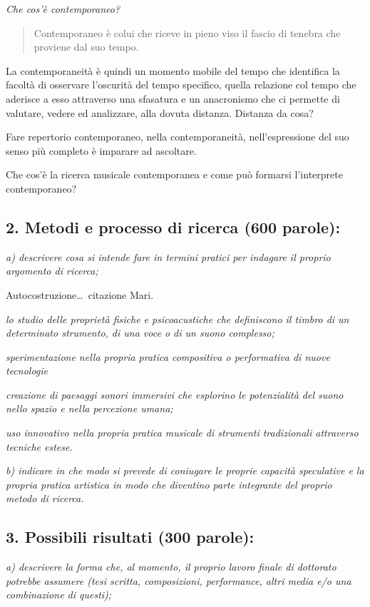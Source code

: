 \documentclass{gs-adonis}
\begin{document}
\emph{Che cos'è contemporaneo?}

\begin{quote}
  Contemporaneo è colui che riceve in pieno viso il fascio di tenebra che proviene dal suo tempo. \cite{agamben2008che}
\end{quote}

La contemporaneità è quindi un momento mobile del tempo che identifica la
facoltà di osservare l’oscurità del tempo specifico, quella relazione col
tempo che aderisce a esso attraverso una sfasatura e un anacronismo che ci
permette di valutare, vedere ed analizzare, alla dovuta distanza. Distanza da
cosa?

Fare repertorio contemporaneo, nella contemporaneità, nell’espressione del suo
senso più completo è imparare ad ascoltare.

Che cos'è la ricerca musicale contemporanea e come può formarsi l'interprete
contemporaneo?

\subsection{2. Metodi e processo di ricerca (600 parole):}

\emph{a) descrivere cosa si intende fare in termini pratici per indagare il proprio argomento di ricerca;}

Autocostruzione… citazione Mari.

\emph{lo studio delle proprietà fisiche e psicoacustiche che definiscono il timbro di un determinato strumento, di una voce o di un suono complesso;}

\emph{sperimentazione nella propria pratica compositiva o performativa di nuove tecnologie}

\emph{creazione di paesaggi sonori immersivi che esplorino le potenzialità del suono nello spazio e nella percezione umana;}

\emph{uso innovativo nella propria pratica musicale di strumenti tradizionali attraverso tecniche estese.}

\emph{b) indicare in che modo si prevede di coniugare le proprie capacità speculative e la propria pratica artistica in modo che diventino parte integrante del proprio metodo di ricerca.}

\subsection{3. Possibili risultati (300 parole):}

\emph{a) descrivere la forma che, al momento, il proprio lavoro finale di dottorato potrebbe assumere (tesi scritta, composizioni, performance, altri media e/o una combinazione di questi);}
\end{document}
